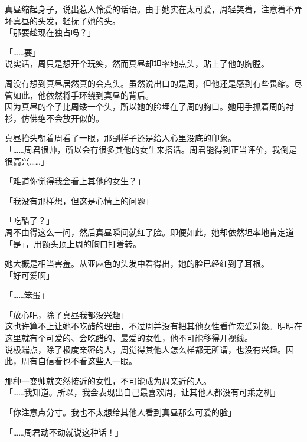 真昼缩起身子，说出惹人怜爱的话语。由于她实在太可爱，周轻笑着，注意着不弄坏真昼的头发，轻抚了她的头。\\

「那要趁现在独占吗？」

「……要」\\

说实话，周只是想开个玩笑，然而真昼却坦率地点头，贴上了他的胸膛。

周没有想到真昼居然真的会点头。虽然说出口的是周，但他还是感到有些畏缩。尽管如此，他依然将手环绕到真昼的背后。\\

因为真昼的个子比周矮一个头，所以她的脸埋在了周的胸口。她用手抓着周的衬衫，仿佛绝不会放开似的。

真昼抬头朝着周看了一眼，那副样子还是给人心里没底的印象。\\

「……周君很帅，所以会有很多其他的女生来搭话。周君能得到正当评价，我倒是很高兴……」

「难道你觉得我会看上其他的女生？」

「我没有那样想，但这是心情上的问题」

「吃醋了？」\\

周不由得这么一问，然后真昼瞬间就红了脸。即便如此，她却依然坦率地肯定道「是」，用额头顶上周的胸口打着转。

她大概是相当害羞。从亚麻色的头发中看得出，她的脸已经红到了耳根。\\

「好可爱啊」

「……笨蛋」

「放心吧，除了真昼我都没兴趣」\\

这也许算不上让她不吃醋的理由，不过周并没有把其他女性看作恋爱对象。明明在这里就有个可爱的、会吃醋的、最爱的女性，他不可能移得开视线。\\

说极端点，除了极度亲密的人，周觉得其他人怎么样都无所谓，也没有兴趣。因此，周有自信看也不看这些人一眼。

那种一变帅就突然接近的女性，不可能成为周亲近的人。\\

「……我知道。所以，我会表现出自己最喜欢周，让其他人都没有可乘之机」

「你注意点分寸。我也不太想给其他人看到真昼那么可爱的脸」

「……周君动不动就说这种话！」\\

